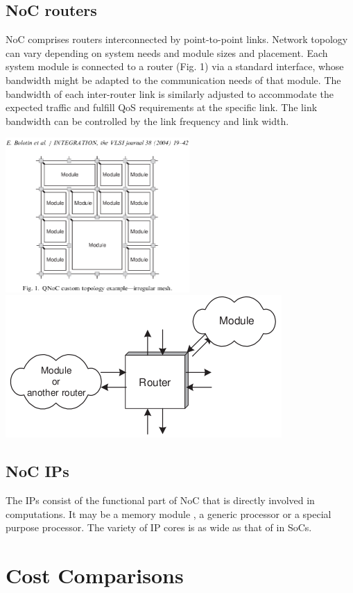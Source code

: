 \subsection{NoC routers}

NoC comprises routers interconnected by point-to-point links. Network
topology can vary depending on system needs and module sizes and placement.
Each system module is connected to a router (Fig. 1) via a standard
interface, whose bandwidth might be adapted to the communication needs
of that module. The bandwidth of each inter-router link is similarly
adjusted to accommodate the expected traffic and fulfill QoS requirements
at the specific link. The link bandwidth can be controlled by the
link frequency and link width.

\includegraphics[width=7cm]{images/1}\includegraphics[scale=0.4]{images/2}


\subsection{NoC IPs}

The IPs consist of the functional part of NoC that is directly involved
in computations. It may be a memory module , a generic processor or
a special purpose processor. The variety of IP cores is as wide as
that of in SoCs.


\section{Cost Comparisons}


